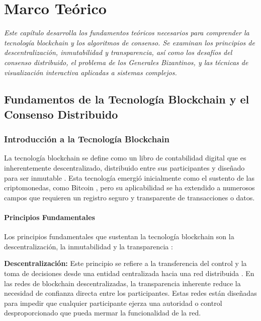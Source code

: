 \documentclass[spanish,12pt,letterpaper]{report}
\begin{document}
\chapter{Marco Teórico}

\textit{Este capítulo desarrolla los fundamentos teóricos necesarios para comprender la tecnología blockchain y los algoritmos de consenso. Se examinan los principios de descentralización, inmutabilidad y transparencia, así como los desafíos del consenso distribuido, el problema de los Generales Bizantinos, y las técnicas de visualización interactiva aplicadas a sistemas complejos.}

\section{Fundamentos de la Tecnología Blockchain y el Consenso Distribuido}

\subsection{Introducción a la Tecnología Blockchain}

La tecnología blockchain se define como un libro de contabilidad digital que es inherentemente descentralizado, distribuido entre sus participantes y diseñado para ser inmutable \parencite{aws2025blockchain}. Esta tecnología emergió inicialmente como el sustento de las criptomonedas, como Bitcoin \parencite{nakamoto2008bitcoin}, pero su aplicabilidad se ha extendido a numerosos campos que requieren un registro seguro y transparente de transacciones o datos.

\subsubsection{Principios Fundamentales}

Los principios fundamentales que sustentan la tecnología blockchain son la descentralización, la inmutabilidad y la transparencia \parencite{amores2020blockchain}:

\textbf{Descentralización:} Este principio se refiere a la transferencia del control y la toma de decisiones desde una entidad centralizada hacia una red distribuida \parencite{aws2025blockchain}. En las redes de blockchain descentralizadas, la transparencia inherente reduce la necesidad de confianza directa entre los participantes. Estas redes están diseñadas para impedir que cualquier participante ejerza una autoridad o control desproporcionado que pueda mermar la funcionalidad de la red.
\end{document}
